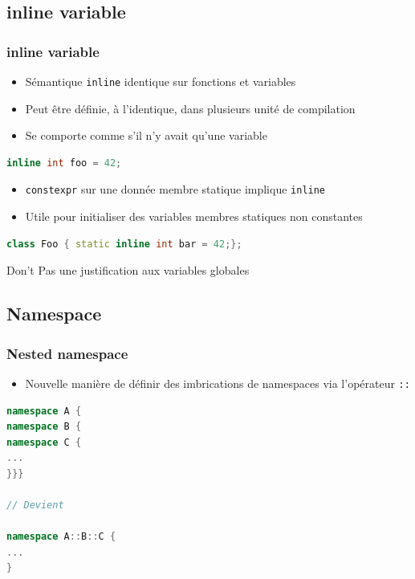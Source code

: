 \documentclass[C++.tex]{subfiles}
\begin{document}
\subsection*{inline variable}
\begin{frame}[fragile]
	\frametitle{inline variable}
	\begin{itemize}
		\item Sémantique \lstinline|inline| identique sur fonctions et variables
		\item Peut être définie, à l'identique, dans plusieurs unité de compilation
		\item Se comporte comme s'il n'y avait qu'une variable
	\end{itemize}

	\begin{lstlisting}[language=C++]
inline int foo = 42;\end{lstlisting}

	\begin{itemize}
		\item \lstinline|constexpr| sur une donnée membre statique implique \lstinline|inline|
		\item Utile pour initialiser des variables membres statiques non constantes
	\end{itemize}

	\begin{lstlisting}[language=C++]
class Foo { static inline int bar = 42;};\end{lstlisting}

	\begin{alertblock}{Don't}
		Pas une justification aux variables globales
	\end{alertblock}
\end{frame}

\subsection*{Namespace}
\begin{frame}[fragile]
	\frametitle{Nested namespace}
	\begin{itemize}
		\item Nouvelle manière de définir des imbrications de namespaces via l'opérateur \lstinline|::| 
	\end{itemize}

	\begin{lstlisting}[language=C++]
namespace A {
namespace B {
namespace C {
...
}}}

// Devient

namespace A::B::C {
...
}\end{lstlisting}
\end{frame}
\end{document}
